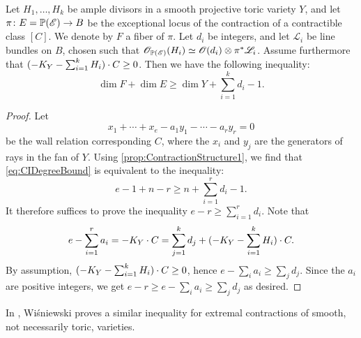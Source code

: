 \begin{proposition}
	\label{prop:SumDegreesBound}
	Let $H_1, \dots, H_k$ be ample divisors in a smooth projective toric variety $Y$, and let $\pi \colon E = \mathbb{P}(\mathscr{E}) \to B$ be the exceptional locus of the contraction of a contractible class $[C]$. We denote by $F$ a fiber of $\pi$. Let $d_i$ be integers, and let $\mathscr{L}_i$ be line bundles on $B$, chosen such that $\mathscr{O}_{\mathbb{P}(\mathscr{E})}(H_i) \simeq \mathscr{O}(d_i) \otimes \pi^*\mathscr{L}_i$. Assume furthermore that $(-K_Y - \sum_{i=1}^k H_i) \cdot C \geq 0$. Then we have the following inequality: 
	\begin{equation}
		\label{eq:CIDegreeBound}
		\dim F + \dim E \geq \dim Y + \sum_{i=1}^k d_i -1.
	\end{equation}
	
\end{proposition}
\begin{proof}
  	 Let
  	\[x_1 + \cdots + x_e - a_1 y_1 - \cdots - a_r y_r =0 \]
  	be the wall relation corresponding $C$,
  	where the $x_i$ and $y_j$ are the generators of rays in the fan of $Y$. Using \cref{prop:ContractionStructure1}, we find that \eqref{eq:CIDegreeBound} is equivalent to the inequality:
	\[e-1 + n - r  \geq n + \sum_{i=1}^r d_i - 1. \]
	It therefore suffices to prove the inequality $e-r \geq \sum_{i=1}^rd_i$. Note that
	\[ e - \sum_{i=1}^r a_i = -K_Y \cdot C = \sum_{j=1}^k d_j + (-K_Y - \sum_{i=1}^k H_i) \cdot C. \]
	By assumption, $(-K_Y - \sum_{i=1}^k H_i) \cdot C \geq 0$, hence $e-\sum_i a_i \geq \sum_j d_j$. Since the $a_i$ are positive integers, we get $e-r \geq e-\sum_i a_i \geq \sum_j d_j$ as desired.
\end{proof}

\begin{remark}
	In \cite{Wis91}, Wi\'{s}niewski proves a similar inequality for extremal contractions of smooth, not necessarily toric, varieties.
\end{remark}

